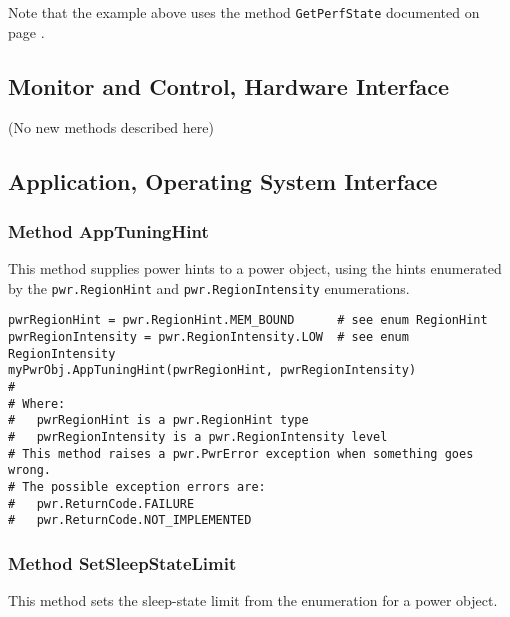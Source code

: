 \documentclass[12pt]{report} %
\begin{document}
\begin{appendices}
Note that the example above uses the method \texttt{GetPerfState} documented on page
\pageref{meth:GetPerfState}.

\subsection{Monitor and Control, Hardware Interface}\label{sec:PythonMonitorControlInterface}
(No new methods described here)

\subsection{Application, Operating System Interface}\label{sec:PythonApplicationInterface}

\subsubsection{Method AppTuningHint} \label{meth:AppTuningHint}

This method supplies power hints to a power object, using the hints enumerated by the
\texttt{pwr.RegionHint} and \texttt{pwr.RegionIntensity} enumerations.

\begin{center}\begin{minipage}{.95\linewidth}\begin{lstlisting}
pwrRegionHint = pwr.RegionHint.MEM_BOUND      # see enum RegionHint
pwrRegionIntensity = pwr.RegionIntensity.LOW  # see enum RegionIntensity
myPwrObj.AppTuningHint(pwrRegionHint, pwrRegionIntensity)
#
# Where:
#   pwrRegionHint is a pwr.RegionHint type
#   pwrRegionIntensity is a pwr.RegionIntensity level
# This method raises a pwr.PwrError exception when something goes wrong.
# The possible exception errors are: 
#   pwr.ReturnCode.FAILURE
#   pwr.ReturnCode.NOT_IMPLEMENTED
\end{lstlisting}\end{minipage}\end{center}

\subsubsection{Method SetSleepStateLimit} \label{meth:SetSleepStateLimit}

This method sets the sleep-state limit from the enumeration for a power object.


\end{appendices}
\end{document}
